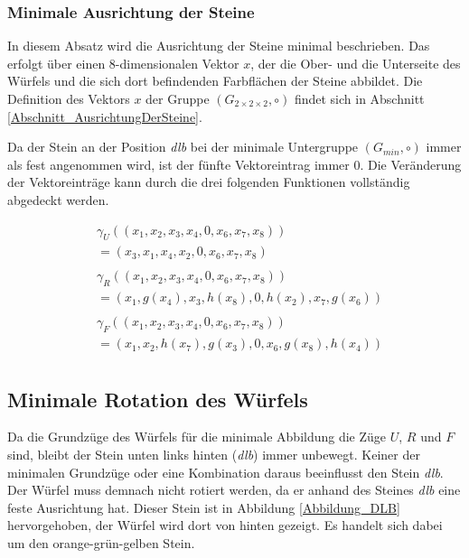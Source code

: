 \documentclass[12pt,a4paper, usenames, dvipsnames]{article}
\theoremstyle{mystyle}
\theoremstyle{definition}
\newcommand{\Gtwo}{\ensuremath{G_{2\times 2\times 2}}}
\begin{document}
\subsubsection*{Minimale Ausrichtung der Steine}

In diesem Absatz wird die Ausrichtung der Steine minimal beschrieben. Das erfolgt über einen 8-dimensionalen Vektor $x$, der die Ober- und die Unterseite des Würfels und die sich dort befindenden Farbflächen der Steine abbildet. Die Definition des Vektors $x$ der Gruppe $(\Gtwo, \circ)$ findet sich in Abschnitt \ref{Abschnitt_AusrichtungDerSteine}.

Da der Stein an der Position \textit{dlb} bei der minimale Untergruppe $(G_{min}, \circ)$ immer als fest angenommen wird, ist der fünfte Vektoreintrag immer 0. 
Die Veränderung der Vektoreinträge kann durch die drei folgenden Funktionen vollständig abgedeckt werden.

\begin{align*}
& \gamma_U \left( (x_1, x_2, x_3, x_4, 0, x_6, x_7, x_8  ) \right) \\ 
& =  \left( x_3, x_1, x_4, x_2, 0, x_6, x_7, x_8 \right) \\
\\ 
& \gamma_R \left( (x_1, x_2, x_3, x_4, 0, x_6, x_7, x_8  ) \right) \\ 
& =  \left( x_1, g(x_4), x_3, h(x_8), 0, h(x_2), x_7, g(x_6) \right) \\ 
\\
& \gamma_F \left( (x_1, x_2, x_3, x_4, 0, x_6, x_7, x_8  ) \right) \\ 
& =  \left( x_1, x_2, h(x_7), g(x_3), 0, x_6, g(x_8), h(x_4) \right) \\
\end{align*}

%
%
%
%
%
%
%
%
%
%
%
%
%
%
%
%
%
%
\subsection{Minimale Rotation des Würfels}

\label{Abschnitt_minimaleRotation}



Da die Grundzüge des Würfels für die minimale Abbildung die Züge $U$, $R$ und $F$ sind, bleibt der Stein unten links hinten (\textit{dlb}) immer unbewegt. Keiner der minimalen Grundzüge oder eine Kombination daraus beeinflusst den Stein \textit{dlb}.
Der Würfel muss demnach nicht rotiert werden, da er anhand des Steines \textit{dlb} eine feste Ausrichtung hat. Dieser Stein ist in Abbildung \ref{Abbildung_DLB} hervorgehoben, der Würfel wird dort von hinten gezeigt. Es handelt sich dabei um den orange-grün-gelben Stein. 
\end{document}
